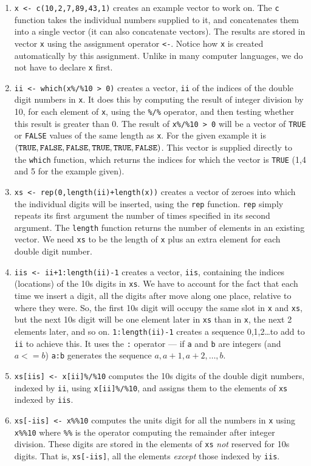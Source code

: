 \documentclass[10pt] {article}
\theoremstyle{definition}
\begin{document}
\begin{enumerate}
\item \verb+x <- c(10,2,7,89,43,1)+ creates an example vector to work on. The {\tt c} function takes the individual numbers supplied to it, and concatenates them into a single vector (it can also concatenate vectors). The results are stored in vector \verb+x+ using the assignment operator \verb+<-+. Notice how {\tt x} is created automatically by this assignment. Unlike in many computer languages, we do not have to declare {\tt x} first. 
\item \verb+ii <- which(x%/%10 > 0)+ creates a vector, {\tt ii} of the indices of the double digit numbers in \verb+x+. It does this by computing the result of integer division by 10, for each element of {\tt x}, using the \verb+%/%+ operator, and then testing whether this result is greater than 0. The result of \verb+x%/%10 > 0+ will be a vector of {\tt TRUE} or {\tt FALSE} values of the same length as {\tt x}. For the given example it is $({\tt TRUE},{\tt FALSE},{\tt FALSE},{\tt TRUE},{\tt TRUE},{\tt FALSE})$. This vector is supplied directly to the {\tt which} function, which returns the indices for which the vector is {\tt TRUE} (1,4 and 5 for the example given). 
\item \verb^xs <- rep(0,length(ii)+length(x))^ creates a vector of zeroes into which the individual digits will be inserted, using the {\tt rep} function. {\tt rep} simply repeats its first argument the number of times specified in its second argument. The {\tt length} function returns the number of elements in an existing vector. We need {\tt xs} to be the length of {\tt x} plus an extra element for each double digit number.
\item \verb^iis <- ii+1:length(ii)-1^ creates a vector, {\tt iis}, containing the indices (locations) of the 10s digits in {\tt xs}. We have to account for the fact that each time we insert a digit, all the digits after move along one place, relative to where they were. So, the first 10s digit will occupy the same slot in {\tt x} and {\tt xs}, but the next 10s digit will be one element later in {\tt xs} than in {\tt x}, the next 2 elements later, and so on. \verb+1:length(ii)-1+ creates a sequence 0,1,2\ldots to add to {\tt ii} to achieve this. It uses the \verb+:+ operator --- if {\tt a} and {\tt b} are integers (and $a<=b$) \verb+a:b+ generates the sequence $a,a+1,a+2,\ldots,b$.
\item \verb+xs[iis] <- x[ii]%/%10+ computes the 10s digits of the double digit numbers, indexed by {\tt ii}, using \verb+x[ii]%/%10+, and assigns them to the elements of {\tt xs} indexed by {\tt iis}.
\item \verb+xs[-iis] <- x%%10+ computes the units digit for all the numbers in {\tt x} using \verb+x%%10+ where \verb+%%+ is the operator computing the remainder after integer division. These digits are stored in the elements of {\tt xs} {\em not} reserved for 10s digits. That is, \verb+xs[-iis]+, all the elements {\em except} those indexed by {\tt iis}. 
\end{enumerate}
\end{document}
